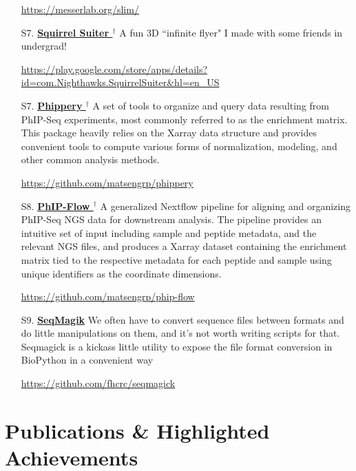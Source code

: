 \documentclass[letterpaper,11pt]{article}
\let\oldhref\href
\renewcommand{\href}[2]{\oldhref{#1}{\bfseries#2}}
\begin{document}
\begin{enumerate}
        \space \url{https://messerlab.org/slim/}

\item [S7.] \href{https://play.google.com/store/apps/details?id=com.Nighthawks.SquirrelSuiter&hl=en_US}{Squirrel Suiter $^{\dagger}$} 
        \space \space A fun 3D ``infinite flyer" I made with some friends in undergrad! 
        
        \space \url{https://play.google.com/store/apps/details?id=com.Nighthawks.SquirrelSuiter&hl=en_US}

\item [S7.] \href{https://github.com/matsengrp/phippery}{Phippery $^{\dagger}$} 
        \space \space A set of tools to organize and query data resulting from PhIP-Seq experiments, most commonly 
        referred to as the enrichment matrix.
        This package heavily relies on the Xarray data structure and provides convenient tools to compute
        various forms of normalization, modeling, and other common analysis methods.
        
        \space \url{https://github.com/matsengrp/phippery}

\item [S8.] \href{https://github.com/matsengrp/phip-flow}{PhIP-Flow $^{\dagger}$}
        \space \space A generalized Nextflow pipeline for aligning and organizing PhIP-Seq NGS data for downstream analysis.
        The pipeline provides an intuitive set of input including sample and peptide metadata, and the relevant NGS files,
        and produces a Xarray dataset containing the enrichment matrix tied to the respective metadata for each peptide and sample using unique
        identifiers as the coordinate dimensions. 

        \space \url{https://github.com/matsengrp/phip-flow}

\item [S9.] \href{https://github.com/fhcrc/seqmagick}{SeqMagik}
        \space \space We often have to convert sequence files between formats and do little manipulations on them, 
        and it's not worth writing scripts for that. 
        Seqmagick is a kickass little utility to expose the file format conversion in BioPython in a convenient way

        \space \url{https://github.com/fhcrc/seqmagick}


\end{enumerate}


\section{Publications \& Highlighted Achievements}
%
\end{document}
